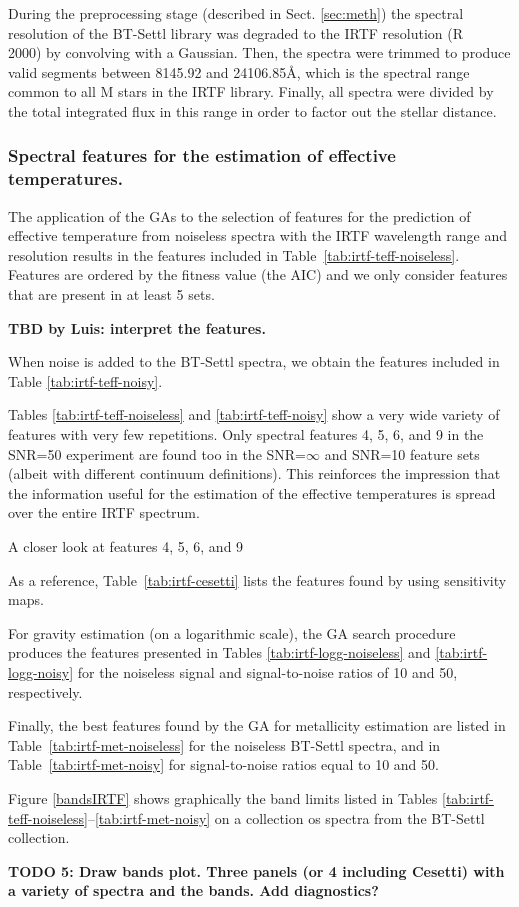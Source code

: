 
During the preprocessing stage (described in Sect. \ref{sec:meth}) the
spectral resolution of the BT-Settl library was degraded to the IRTF
resolution (R ~ 2000) by convolving with a Gaussian. Then, the spectra
were trimmed to produce valid segments between 8145.92 and
24106.85{\AA}, which is the spectral range common to all M stars in
the IRTF library. Finally, all spectra were divided by the total
integrated flux in this range in order to factor out the stellar
distance.

\subsubsection{Spectral features for the estimation of effective temperatures.}

The application of the GAs to the selection of features for the
prediction of effective temperature from noiseless spectra with the
IRTF wavelength range and resolution results in the features included
in Table~\ref{tab:irtf-teff-noiseless}. Features are ordered by the
fitness value (the AIC) and we only consider features that are present
in at least 5 sets.

{\bf TBD by Luis: interpret the features.}

When noise is added to the BT-Settl spectra, we obtain the features
included in Table \ref{tab:irtf-teff-noisy}.


Tables \ref{tab:irtf-teff-noiseless} and \ref{tab:irtf-teff-noisy}
show a very wide variety of features with very few repetitions. Only
spectral features 4, 5, 6, and 9 in the SNR=50 experiment are found
too in the SNR=$\infty$ and SNR=10 feature sets (albeit with different
continuum definitions). This reinforces the impression that the
information useful for the estimation of the effective temperatures is
spread over the entire IRTF spectrum.

A closer look at features 4, 5, 6, and 9 

As a reference, Table~\ref{tab:irtf-cesetti} lists the features found
by \cite{cesetti} using sensitivity maps.

For gravity estimation (on a logarithmic scale), the GA search
procedure produces the features presented in
Tables \ref{tab:irtf-logg-noiseless} and \ref{tab:irtf-logg-noisy} for
the noiseless signal and signal-to-noise ratios of 10 and 50,
respectively.

Finally, the best features found by the GA for metallicity estimation
are listed in Table~\ref{tab:irtf-met-noiseless} for the noiseless BT-Settl
spectra, and in Table~\ref{tab:irtf-met-noisy} for signal-to-noise
ratios equal to 10 and 50.

Figure \ref{bandsIRTF} shows graphically the band limits listed in
Tables \ref{tab:irtf-teff-noiseless}--\ref{tab:irtf-met-noisy} on a
collection os spectra from the BT-Settl collection.

{\bf TODO 5: Draw bands plot. Three panels (or 4 including Cesetti) with
a variety of spectra and the bands. Add diagnostics?}
